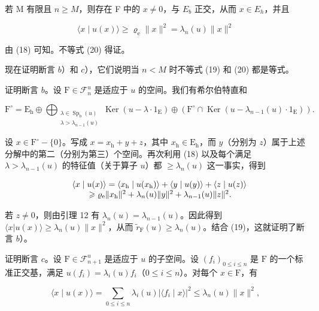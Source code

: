 若 M 有限且 \(n \geqslant M\)，则存在 F 中的 \(x \neq 0\)，与 \(E_{b}\) 正交，从而 \(x \in E_{h}\)，并且

\[
\langle x \mid u (x) \rangle \geqslant \varrho_ {\mathrm{e}} \| x \| ^ {2} = \lambda_ {n} (u) \| x \| ^ {2}
\]

由 (18) 可知。不等式 (20) 得证。

现在证明断言 \(b\)）和 \(c\)），它们说明当 \(n < M\) 时不等式 (19) 和 (20) 都是等式。

证明断言 \(b\)。设 \(\mathrm{F} \in \mathcal{F}_n^u\) 是适应于 \(u\) 的空间。我们有希尔伯特直和

\[
\mathrm{F}^{\circ} = \mathrm{E}_{\mathrm{h}}\oplus \bigoplus_{\substack{\lambda \in \operatorname{Sp}_{\mathrm{b}}(u)\\ \lambda >\lambda_{n - 1}(u)}}\operatorname{Ker}(u - \lambda \cdot 1_{\mathrm{E}})\oplus (\mathrm{F}^{\circ}\cap \operatorname{Ker}(u - \lambda_{n - 1}(u)\cdot 1_{\mathrm{E}})).
\]

设 \(x \in \mathrm{F}^{\circ} - \{0\}\)。写成 \(x = x_{\mathrm{h}} + y + z\)，其中 \(x_{\mathrm{h}} \in \mathrm{E}_{\mathrm{h}}\)，而 \(y\)（分别为 \(z\)）属于上述分解中的第二（分别为第三）个空间。再次利用 (18) 以及每个满足 \(\lambda > \lambda_{n-1}(u)\) 的特征值（关于算子 \(u\)）都 \(\geqslant \lambda_n(u)\) 这一事实，得到

\[
\begin{array}{r l} & {\langle x \mid u (x) \rangle = \langle x _ {\mathrm{h}} \mid u (x _ {\mathrm{h}}) \rangle + \langle y \mid u (y) \rangle + \langle z \mid u (z) \rangle} \\ & {\qquad \geqslant \varrho_ {\mathrm{e}} \| x _ {\mathrm{h}} \| ^ {2} + \lambda_ {n} (u) \| y \| ^ {2} + \lambda_ {n - 1} (u) \| z \| ^ {2}.} \end{array}
\]

若 \(z \neq 0\)，则由引理 12 有 \(\lambda_n(u) = \lambda_{n-1}(u)\)。因此得到 \(\langle x | u(x) \rangle \geqslant \lambda_n(u) \| x \|^2\)，从而 \(\widetilde{r}_{\mathrm{F}}(u) \geqslant \lambda_n(u)\)。结合 (19)，这就证明了断言 \(b\)）。

证明断言 \(c\)。设 \(\mathrm{F} \in \mathcal{F}_{n+1}^{u}\) 是适应于 \(u\) 的子空间。设 \((f_{i})_{0 \leqslant i \leqslant n}\) 是 \(\mathrm{F}\) 的一个标准正交基，满足 \(u(f_{i}) = \lambda_{i}(u)f_{i}\)（\(0 \leqslant i \leqslant n\)）。对每个 \(x \in \mathrm{F}\)，有

\[
\langle x \mid u (x) \rangle = \sum_ {0 \leqslant i \leqslant n} \lambda_ {i} (u) | \langle f _ {i} \mid x \rangle | ^ {2} \leqslant \lambda_ {n} (u) \| x \| ^ {2},
\]

